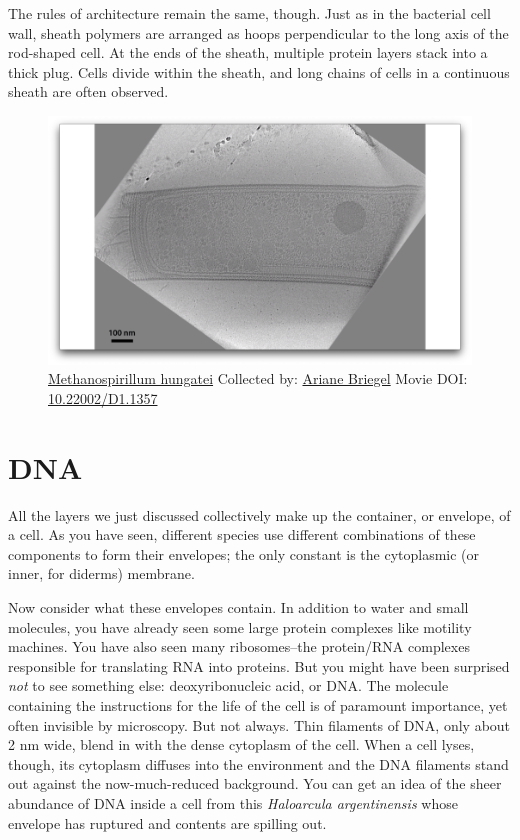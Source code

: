 \documentclass[]{tufte-book}
\begin{document}
The rules of architecture remain the same, though. Just as in the
bacterial cell wall, sheath polymers are arranged as hoops perpendicular
to the long axis of the rod-shaped cell. At the ends of the sheath,
multiple protein layers stack into a thick plug. Cells divide within the
sheath, and long chains of cells in a continuous sheath are often
observed.





\begin{figure}
\includegraphics{movie_stills/2_8} \caption[\protect\hyperlink{tree}{Methanospirillum hungatei} Collected
by: \protect\hyperlink{ariane_briegel}{Ariane Briegel} Movie DOI:
\href{https://doi.org/10.22002/D1.1357}{10.22002/D1.1357}]{\protect\hyperlink{tree}{Methanospirillum hungatei} Collected
by: \protect\hyperlink{ariane_briegel}{Ariane Briegel} Movie DOI:
\href{https://doi.org/10.22002/D1.1357}{10.22002/D1.1357}}\label{fig:2-8}
\end{figure}

\section{DNA}\label{dna}

All the layers we just discussed collectively make up the container, or
envelope, of a cell. As you have seen, different species use different
combinations of these components to form their envelopes; the only
constant is the cytoplasmic (or inner, for diderms) membrane.

Now consider what these envelopes contain. In addition to water and
small molecules, you have already seen some large protein complexes like
motility machines. You have also seen many ribosomes--the protein/RNA
complexes responsible for translating RNA into proteins. But you might
have been surprised \emph{not} to see something else: deoxyribonucleic
acid, or DNA. The molecule containing the instructions for the life of
the cell is of paramount importance, yet often invisible by microscopy.
But not always. Thin filaments of DNA, only about 2 nm wide, blend in
with the dense cytoplasm of the cell. When a cell lyses, though, its
cytoplasm diffuses into the environment and the DNA filaments stand out
against the now-much-reduced background. You can get an idea of the
sheer abundance of DNA inside a cell from this \emph{Haloarcula
argentinensis} whose envelope has ruptured and contents are spilling
out.
\end{document}
